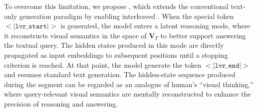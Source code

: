 To overcome this limitation, we propose \modelname, which extends the conventional text-only generation paradigm by enabling interleaved \modelfullname. When the special token $<\vert\texttt{lvr\_start}\vert>$ is generated, the model enters a latent reasoning mode, where it reconstructs visual semantics in the space of $\mathbf{V}_T$ to better support answering the textual query. The hidden states produced in this mode are directly propagated as input embeddings to subsequent positions until a stopping criterion is reached. At that point, the model generate the token $<\vert\texttt{lvr\_end}\vert>$ and resumes standard text generation. The hidden-state sequence produced during the \modelname segment can be regarded as an analogue of human's ``visual thinking,'' where query-relevant visual semantics are mentally reconstructed to enhance the precision of reasoning and answering.





